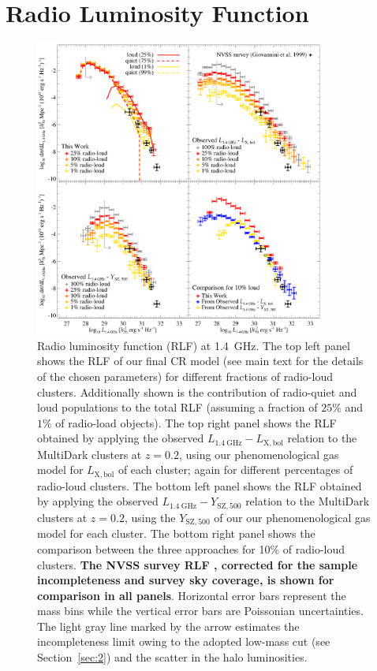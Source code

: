 \documentclass[traditabstract]{aa}
\def\C#1{{\bf #1}}
\newcommand{\rmn}{\mathrm}
\begin{document}
\section{Radio Luminosity Function}
\label{sec:5}

\begin{figure}[t]
\centering
\includegraphics[width=0.85\textwidth]{figures/RLFs_1.4.eps}
\caption{Radio luminosity function (RLF) at 1.4~GHz. The top left panel shows
  the RLF of our final CR model (see main text for the details of the chosen
  parameters) for different fractions of radio-loud clusters. Additionally shown
  is the contribution of radio-quiet and loud populations to the total RLF
  (assuming a fraction of $25\%$ and $1\%$ of radio-load objects). The top right
  panel shows the RLF obtained by applying the observed
  $L_{1.4~\rmn{GHz}}-L_{\rmn{X,bol}}$ relation to the MultiDark clusters at $z =
  0.2$, using our phenomenological gas model for $L_{\rmn{X,bol}}$ of each
  cluster; again for different percentages of radio-loud clusters.  The bottom
  left panel shows the RLF obtained by applying the observed
  $L_{1.4~\rmn{GHz}}-Y_{\rmn{SZ}, 500}$ relation to the MultiDark clusters at $z
  = 0.2$, using the $Y_{\rmn{SZ}, 500}$ of our our phenomenological gas model
  for each cluster. The bottom right panel shows the comparison between the
  three approaches for 10\% of radio-loud clusters. \C{The NVSS survey RLF
  \citep{1999NewA....4..141G}, corrected for the sample incompleteness and survey
  sky coverage, is shown for comparison in all panels}. Horizontal
  error bars represent the mass bins while the vertical error bars are
  Poissonian uncertainties. The light gray line marked by the arrow 
  estimates the incompleteness limit owing to the adopted
  low-mass cut (see Section~\ref{sec:2}) and the scatter in the halo
  luminosities.}
\label{fig:RLF_1.4}
\end{figure}
\end{document}
